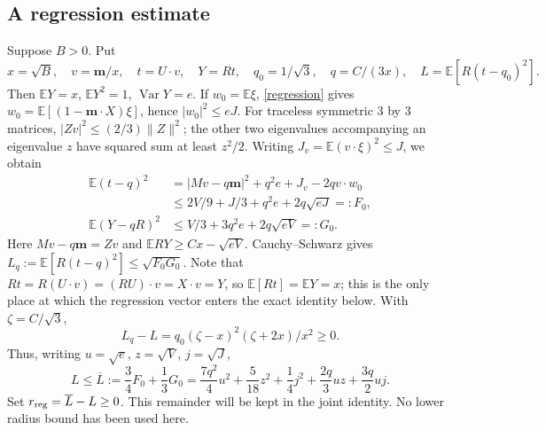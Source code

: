 \documentclass[11pt]{article}
\theoremstyle{remark}\newtheorem{remark}[theorem]{Remark}
\newcommand{\E}{\mathbb E}
\numberwithin{equation}{section}
\begin{document}
\subsection{A regression estimate}
Suppose $B>0$. Put
\[
 x=\sqrt B,\quad v=\mathbf m/x,\quad t=U\cdot v,\quad Y=Rt,\quad
 q_0=1/\sqrt3,\quad q=C/(3x),\quad L=\E[R(t-q_0)^2].
\]
Then $\E Y=x$, $\E Y^2=1$, $\operatorname{Var}Y=e$.
If $w_0=\E\xi$, \eqref{regression} gives
$w_0=\E[(1-\mathbf m\cdot X)\xi]$, hence $|w_0|^2\le eJ$.
For traceless symmetric $3$ by $3$ matrices,
$|Zv|^2\le(2/3)\|Z\|^2$; the other two eigenvalues accompanying an
eigenvalue $z$ have squared sum at least $z^2/2$.
Writing $J_v=\E(v\cdot\xi)^2\le J$, we obtain
\begin{align*}
 \E(t-q)^2
 &=|Mv-q\mathbf m|^2+q^2e+J_v-2qv\cdot w_0\\
 &\le 2V/9+J/3+q^2e+2q\sqrt{eJ}=:F_0,\\
 \E(Y-qR)^2&\le V/3+3q^2e+2q\sqrt{eV}=:G_0.
\end{align*}
Here $Mv-q\mathbf m=Zv$ and $\E RY\ge Cx-\sqrt{eV}$.
Cauchy--Schwarz gives $L_q:=\E[R(t-q)^2]\le\sqrt{F_0G_0}$.
Note that $Rt=R(U\cdot v)=(RU)\cdot v=X\cdot v=Y$, so $\E[Rt]=\E Y=x$;
this is the only place at which the regression vector enters the exact
identity below. With $\zeta=C/\sqrt3$,
\[
 L_q-L=q_0(\zeta-x)^2(\zeta+2x)/x^2\ge0.
\]
Thus, writing $u=\sqrt e$, $z=\sqrt V$, $j=\sqrt J$,
\begin{equation}\label{Lbar}
 L\le\overline L:=\frac34F_0+\frac13G_0
 =\frac{7q^2}{4}u^2+\frac5{18}z^2+\frac14j^2
                       +\frac{2q}{3}uz+\frac{3q}{2}uj.
\end{equation}
Set $r_{\rm reg}=\overline L-L\ge0$. This remainder will be kept
in the joint identity. No lower radius bound has been used here.
\end{document}
